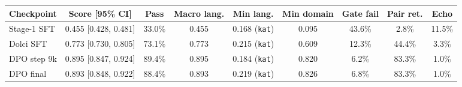 \begin{tabular}{lcccccccc}
\toprule
Checkpoint & Score [95\% CI] & Pass & Macro lang. & Min lang. & Min domain & Gate fail & Pair ret. & Echo \\
\midrule
Stage-1 SFT & 0.455 [0.428, 0.481] & 33.0\% & 0.455 & 0.168 (\texttt{kat}) & 0.095 & 43.6\% & 2.8\% & 11.5\% \\
Dolci SFT & 0.773 [0.730, 0.805] & 73.1\% & 0.773 & 0.215 (\texttt{kat}) & 0.609 & 12.3\% & 44.4\% & 3.3\% \\
DPO step 9k & 0.895 [0.847, 0.924] & 89.4\% & 0.895 & 0.184 (\texttt{kat}) & 0.820 & 6.2\% & 83.3\% & 1.0\% \\
DPO final & 0.893 [0.848, 0.922] & 88.4\% & 0.893 & 0.219 (\texttt{kat}) & 0.826 & 6.8\% & 83.3\% & 1.0\% \\
\bottomrule
\end{tabular}
